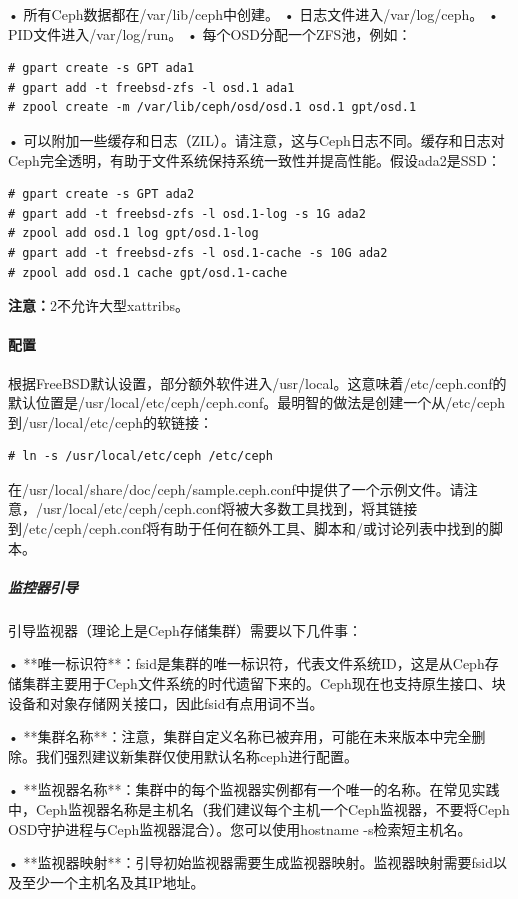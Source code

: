 \documentclass[12pt,UTF8]{ctexbook}
\begin{document}
• 所有Ceph数据都在/var/lib/ceph中创建。
• 日志文件进入/var/log/ceph。
• PID文件进入/var/log/run。
• 每个OSD分配一个ZFS池，例如：
\begin{verbatim}
# gpart create -s GPT ada1
# gpart add -t freebsd-zfs -l osd.1 ada1
# zpool create -m /var/lib/ceph/osd/osd.1 osd.1 gpt/osd.1
\end{verbatim}

• 可以附加一些缓存和日志（ZIL）。请注意，这与Ceph日志不同。缓存和日志对Ceph完全透明，有助于文件系统保持系统一致性并提高性能。假设ada2是SSD：
\begin{verbatim}
# gpart create -s GPT ada2
# gpart add -t freebsd-zfs -l osd.1-log -s 1G ada2
# zpool add osd.1 log gpt/osd.1-log
# gpart add -t freebsd-zfs -l osd.1-cache -s 10G ada2
# zpool add osd.1 cache gpt/osd.1-cache
\end{verbatim}

\textbf{注意：}\nUFS2不允许大型xattribs。

\paragraph{配置}
根据FreeBSD默认设置，部分额外软件进入/usr/local。这意味着/etc/ceph.conf的默认位置是/usr/local/etc/ceph/ceph.conf。最明智的做法是创建一个从/etc/ceph到/usr/local/etc/ceph的软链接：
\begin{verbatim}
# ln -s /usr/local/etc/ceph /etc/ceph
\end{verbatim}

在/usr/local/share/doc/ceph/sample.ceph.conf中提供了一个示例文件。请注意，/usr/local/etc/ceph/ceph.conf将被大多数工具找到，将其链接到/etc/ceph/ceph.conf将有助于任何在额外工具、脚本和/或讨论列表中找到的脚本。

\subparagraph{监控器引导}
引导监视器（理论上是Ceph存储集群）需要以下几件事：

• **唯一标识符**：fsid是集群的唯一标识符，代表文件系统ID，这是从Ceph存储集群主要用于Ceph文件系统的时代遗留下来的。Ceph现在也支持原生接口、块设备和对象存储网关接口，因此fsid有点用词不当。

• **集群名称**：注意，集群自定义名称已被弃用，可能在未来版本中完全删除。我们强烈建议新集群仅使用默认名称ceph进行配置。

• **监视器名称**：集群中的每个监视器实例都有一个唯一的名称。在常见实践中，Ceph监视器名称是主机名（我们建议每个主机一个Ceph监视器，不要将Ceph OSD守护进程与Ceph监视器混合）。您可以使用hostname -s检索短主机名。

• **监视器映射**：引导初始监视器需要生成监视器映射。监视器映射需要fsid以及至少一个主机名及其IP地址。
\end{document}
